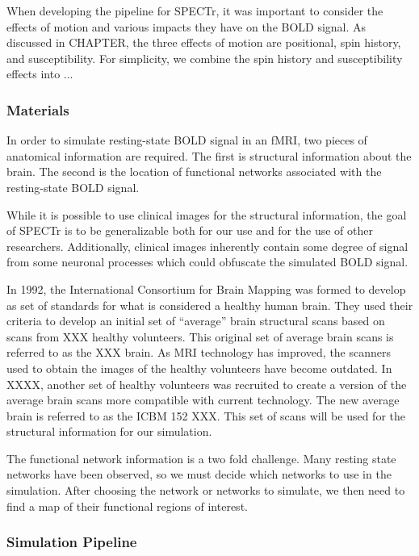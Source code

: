 When developing the pipeline for SPECTr, it was important to consider the effects of motion and various impacts they have on the BOLD signal. As discussed in CHAPTER, the three effects of motion are positional, spin history, and susceptibility. For simplicity, we combine the spin history and susceptibility effects into ...

\subsubsection{Materials}

In order to simulate resting-state BOLD signal in an fMRI, two pieces of anatomical information are required. The first is structural information about the brain. The second is the location of functional networks associated with the resting-state BOLD signal.

While it is possible to use clinical images for the structural information, the goal of SPECTr is to be generalizable both for our use and for the use of other researchers. Additionally, clinical images inherently contain some degree of signal from some neuronal processes which could obfuscate the simulated BOLD signal. 

In 1992, the International Consortium for Brain Mapping was formed to develop as set of standards for what is considered a healthy human brain. They used their criteria to develop an initial set of ``average'' brain structural scans based on scans from XXX healthy volunteers. This original set of average brain scans is referred to as the XXX brain. As MRI technology has improved, the scanners used to obtain the images of the healthy volunteers have become outdated. In XXXX, another set of healthy volunteers was recruited to create a version of the average brain scans more compatible with current technology. The new average brain is referred to as the ICBM 152 XXX. This set of scans will be used for the structural information for our simulation.

The functional network information is a two fold challenge. Many resting state networks have been observed, so we must decide which networks to use in the simulation. After choosing the network or networks to simulate, we then need to find a map of their functional regions of interest.



\subsubsection{Simulation Pipeline}

